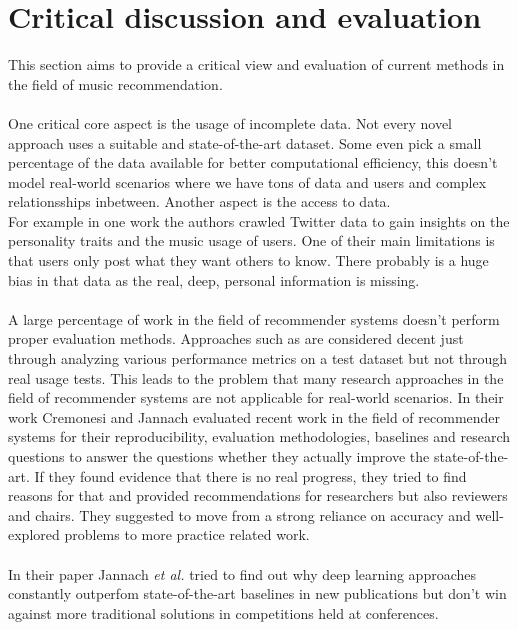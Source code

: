 \documentclass[runningheads,a4paper]{llncs}
\begin{document}
\section{Critical discussion and evaluation}
This section aims to provide a critical view and evaluation of current methods in the field of music recommendation. \\
\\
One critical core aspect is the usage of incomplete data. Not every novel approach uses a suitable and state-of-the-art dataset.
Some even pick a small percentage of the data available for better computational efficiency, this doesn't model real-world scenarios where we have tons of data and users and complex relationsships inbetween. 
Another aspect is the access to data. \\
For example in one work  \cite{melchiorre2020personality}  the authors crawled Twitter data
 to gain insights on the personality traits and the music usage of users. 
One of their main limitations is that users only post what they want others to know. There probably is a huge bias in that data as the real, deep, personal information is missing. \\
\\
A large percentage of work in the field of recommender systems doesn't perform proper evaluation methods. 
Approaches such as \cite{niyazov2021content} are considered decent just through analyzing various performance metrics on a test dataset but not 
through real usage tests. This leads to the problem that many research approaches in the field of recommender systems are 
not applicable for real-world scenarios. 
In their work Cremonesi and Jannach evaluated recent work in the field of recommender systems for their reproducibility, 
evaluation methodologies, baselines and research questions to answer the questions whether they actually improve the state-of-the-art.
If they found evidence that there is no real progress, they tried to find reasons for that and provided recommendations for researchers 
but also reviewers and chairs. 
They suggested to move from a strong reliance on accuracy and well-explored problems to more practice related work. \cite{cremonesi2021progress} \\
\\
In their paper Jannach \textit{et al.} tried to find out why deep learning approaches constantly outperfom state-of-the-art baselines
in new publications but don't win against more traditional solutions in competitions held at conferences. 
\end{document}
